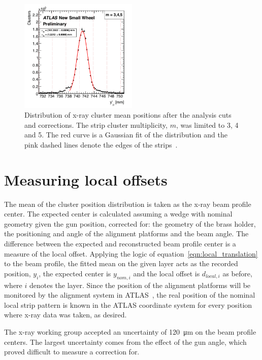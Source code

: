 \begin{figure}
    \centering
    \includegraphics[width = 0.5\textwidth]{figures/figure_xray_beam_profile.pdf}
    \caption{Distribution of x-ray cluster mean positions after the analysis cuts and corrections. The strip cluster multiplicity, $m$, was limited to 3, 4 and 5. The red curve is a Gaussian fit of the distribution and the pink dashed lines denote the edges of the strips~\cite{lefebvre_precision_2020}.}
    \label{fig:xray_beam_profile}
\end{figure}

\section{Measuring local offsets}
The mean of the cluster position distribution is taken as the x-ray beam profile center. The expected center is calculated assuming a wedge with nominal geometry given the gun position, corrected for: the geometry of the brass holder, the positioning and angle of the alignment platforms and the beam angle. The difference between the expected and reconstructed beam profile center is a measure of the local offset. Applying the logic of equation~\ref{eqn:local_translation} to the beam profile, the fitted mean on the given layer acts as the recorded position, $y_i$, the expected center is $y_{nom, i}$ and the local offset is $d_{local, i}$ as before, where $i$ denotes the layer. Since the position of the alignment platforms will be monitored by the alignment system in ATLAS~\cite{nsw_tdr}, the real position of the nominal local strip pattern is known in the ATLAS coordinate system for every position where x-ray data was taken, as desired.

The x-ray working group accepted an uncertainty of \SI{120}{\micro\meter} on the beam profile centers. The largest uncertainty comes from the effect of the gun angle, which proved difficult to measure a correction for.


